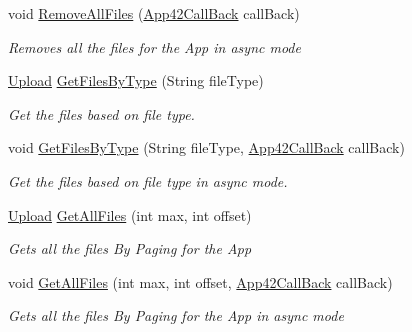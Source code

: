 \begin{DoxyCompactItemize}
void \hyperlink{classcom_1_1shephertz_1_1app42_1_1paas_1_1sdk_1_1csharp_1_1upload_1_1_upload_service_a86955c12bf10af864f1137c23e0056e0}{Remove\+All\+Files} (\hyperlink{interfacecom_1_1shephertz_1_1app42_1_1paas_1_1sdk_1_1csharp_1_1_app42_call_back}{App42\+Call\+Back} call\+Back)
\begin{DoxyCompactList}\small\item\em Removes all the files for the App in async mode \end{DoxyCompactList}\item 
\hyperlink{classcom_1_1shephertz_1_1app42_1_1paas_1_1sdk_1_1csharp_1_1upload_1_1_upload}{Upload} \hyperlink{classcom_1_1shephertz_1_1app42_1_1paas_1_1sdk_1_1csharp_1_1upload_1_1_upload_service_a088b315702babe7f138ab28029049c33}{Get\+Files\+By\+Type} (String file\+Type)
\begin{DoxyCompactList}\small\item\em Get the files based on file type. \end{DoxyCompactList}\item 
void \hyperlink{classcom_1_1shephertz_1_1app42_1_1paas_1_1sdk_1_1csharp_1_1upload_1_1_upload_service_ab18110d90a7087393657e305549e51f3}{Get\+Files\+By\+Type} (String file\+Type, \hyperlink{interfacecom_1_1shephertz_1_1app42_1_1paas_1_1sdk_1_1csharp_1_1_app42_call_back}{App42\+Call\+Back} call\+Back)
\begin{DoxyCompactList}\small\item\em Get the files based on file type in async mode. \end{DoxyCompactList}\item 
\hyperlink{classcom_1_1shephertz_1_1app42_1_1paas_1_1sdk_1_1csharp_1_1upload_1_1_upload}{Upload} \hyperlink{classcom_1_1shephertz_1_1app42_1_1paas_1_1sdk_1_1csharp_1_1upload_1_1_upload_service_a89a5dee613b1880d659d11241759cd0d}{Get\+All\+Files} (int max, int offset)
\begin{DoxyCompactList}\small\item\em Gets all the files By Paging for the App \end{DoxyCompactList}\item 
void \hyperlink{classcom_1_1shephertz_1_1app42_1_1paas_1_1sdk_1_1csharp_1_1upload_1_1_upload_service_a3fb5b3edca7ebfb58eee03a0860c826d}{Get\+All\+Files} (int max, int offset, \hyperlink{interfacecom_1_1shephertz_1_1app42_1_1paas_1_1sdk_1_1csharp_1_1_app42_call_back}{App42\+Call\+Back} call\+Back)
\begin{DoxyCompactList}\small\item\em Gets all the files By Paging for the App in async mode \end{DoxyCompactList}\item 

\end{DoxyCompactItemize}
